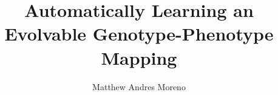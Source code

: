 \documentclass[12pt]{article}
\title{Automatically Learning an Evolvable Genotype-Phenotype Mapping}
\author{Matthew Andres Moreno}
\theoremstyle{definition}
\begin{document}
\section*{\thetitle}

















\end{document}

